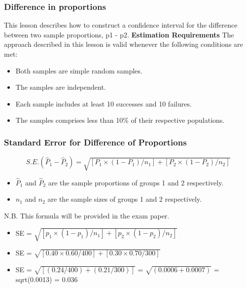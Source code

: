 \documentclass[a4]{beamer}
\begin{document}
\begin{frame}
\frametitle{Difference in proportions}
This lesson describes how to construct a confidence interval for the difference between two sample proportions, p1 - p2.
\textbf{Estimation Requirements}
The approach described in this lesson is valid whenever the following conditions are met:

\begin{itemize}
\item Both samples are simple random samples.
\item The samples are independent.
\item Each sample includes at least 10 successes and 10 failures.
\item The samples comprises less than 10\% of their respective populations.
\end{itemize}
\end{frame}


\begin{frame}
\frametitle{Standard Error for Difference of Proportions}

\[S.E. (\hat{P}_1 - \hat{P}_2)  = \sqrt{ [P_1 \times (1 - P_1) / n_1] + [P_2 \times (1 - P_2) / n_2] } \] 
\begin{itemize}
\item $\hat{P}_1$ and $\hat{P}_2$ are the sample proportions of groups 1 and 2 respectively.
\item $n_1$ and $n_2$ are the sample sizes of groups 1 and 2 respectively.
\end{itemize}
N.B. This formula will be provided in the exam paper.
\end{frame}


\begin{frame}
\begin{itemize}
\item SE = $\sqrt{ [p_1 \times (1 - p_1) / n_1] + [p_2 \times (1 - p_2) / n_2] } $
\item SE = $\sqrt{ [0.40 \times 0.60 / 400] + [0.30 \times 0.70 / 300] } $
\item SE  = $\sqrt{[ (0.24 / 400) + (0.21 / 300) ]}$ = $\sqrt{(0.0006 + 0.0007)}$ = sqrt(0.0013) = 0.036 
\end{itemize}
\end{frame}


\end{document}
